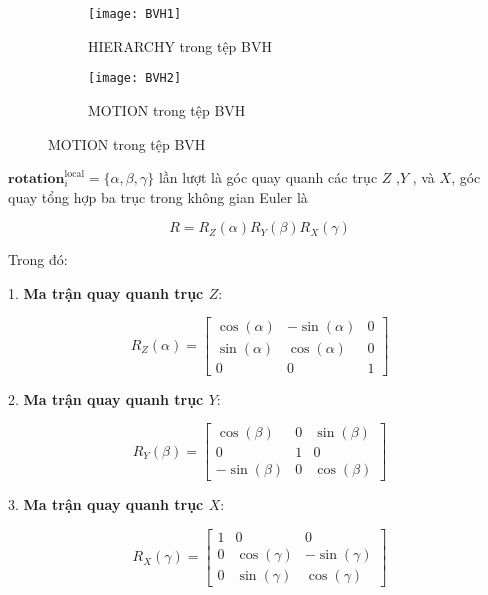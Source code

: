 \begin{figure}[htbp]
	\centering
	\begin{subfigure}{0.49\textwidth}
		\centering
		\texttt{[image: BVH1]}
		\caption{HIERARCHY trong tệp BVH}
		\label{fig:BVH1}
	\end{subfigure}
	\hfill
	\begin{subfigure}{0.49\textwidth}
		\centering
		\texttt{[image: BVH2]}
		\caption{MOTION trong tệp BVH}
		\label{fig:BVH2}
	\end{subfigure}
\end{figure}




	
$\mathbf{rotation}_i^{\operatorname{local}} = \{ \alpha ,\beta , \gamma \}$ lần lượt là góc quay quanh các trục $Z$ ,$Y$ , và $X$, góc quay tổng hợp ba trục trong không gian Euler là 

\begin{equation}
R = R_Z(\alpha) R_Y(\beta) R_X(\gamma)
\end{equation}

Trong đó:

1. \textbf{Ma trận quay quanh trục \(Z\)}:

\[
R_Z(\alpha) = 
\begin{bmatrix}
	\cos(\alpha) & -\sin(\alpha) & 0 \\
	\sin(\alpha) & \cos(\alpha) & 0 \\
	0 & 0 & 1
\end{bmatrix}
\]

2. \textbf{Ma trận quay quanh trục \(Y\)}:

\[
R_Y(\beta) = 
\begin{bmatrix}
	\cos(\beta) & 0 & \sin(\beta) \\
	0 & 1 & 0 \\
	-\sin(\beta) & 0 & \cos(\beta)
\end{bmatrix}
\]

3. \textbf{Ma trận quay quanh trục \(X\)}:

\[
R_X(\gamma) = 
\begin{bmatrix}
	1 & 0 & 0 \\
	0 & \cos(\gamma) & -\sin(\gamma) \\
	0 & \sin(\gamma) & \cos(\gamma)
\end{bmatrix}
\]


